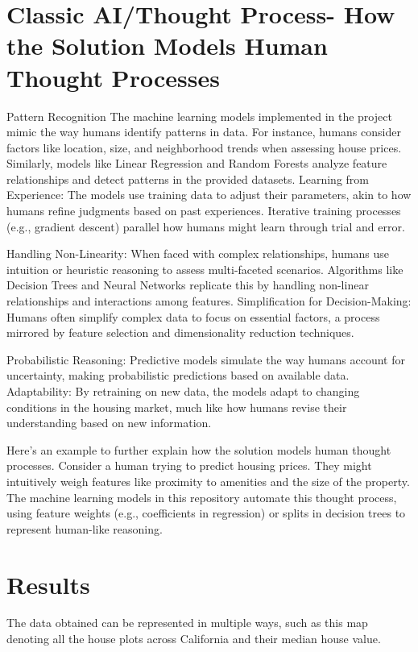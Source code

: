 \documentclass{article}
\begin{document}
\section{Classic AI/Thought Process- How the Solution Models Human Thought Processes}
Pattern Recognition The machine learning models implemented in the project mimic the way humans identify patterns in data. For instance, humans consider factors like location, size, and neighborhood trends when assessing house prices. Similarly, models like Linear Regression and Random Forests analyze feature relationships and detect patterns in the provided datasets.
Learning from Experience: The models use training data to adjust their parameters, akin to how humans refine judgments based on past experiences. Iterative training processes (e.g., gradient descent) parallel how humans might learn through trial and error.

Handling Non-Linearity: When faced with complex relationships, humans use intuition or heuristic reasoning to assess multi-faceted scenarios. Algorithms like Decision Trees and Neural Networks replicate this by handling non-linear relationships and interactions among features.
Simplification for Decision-Making: Humans often simplify complex data to focus on essential factors, a process mirrored by feature selection and dimensionality reduction techniques.

Probabilistic Reasoning: Predictive models simulate the way humans account for uncertainty, making probabilistic predictions based on available data.
Adaptability: By retraining on new data, the models adapt to changing conditions in the housing market, much like how humans revise their understanding based on new information.

Here’s an example to further explain how the solution models human thought processes. Consider a human trying to predict housing prices. They might intuitively weigh features like proximity to amenities and the size of the property. The machine learning models in this repository automate this thought process, using feature weights (e.g., coefficients in regression) or splits in decision trees to represent human-like reasoning.

\section{Results}
The data obtained can be represented in multiple ways, such as this map denoting all the house plots across California and their median house value.  
\end{document}
